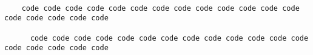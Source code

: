 \documentclass{article}
\begin{document}
\begin{verbatim}

    code code code code code code code code code code code code code code code code code code

      code code code code code code code code code code code code code code code code code code

\end{verbatim}
\end{document}
